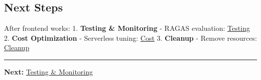 \hypertarget{next-steps}{%
\subsection{Next Steps}}

After frontend works: 1. \textbf{Testing \& Monitoring} - RAGAS
evaluation: \href{5.15-Testing/}{Testing} 2. \textbf{Cost Optimization}
- Serverless tuning: \href{5.16-Cost/}{Cost} 3. \textbf{Cleanup} -
Remove resources: \href{5.17-Cleanup/}{Cleanup}

\begin{center}\rule{0.5\linewidth}{0.5pt}\end{center}

\textbf{Next:} \href{5.15-Testing/}{Testing \& Monitoring}
